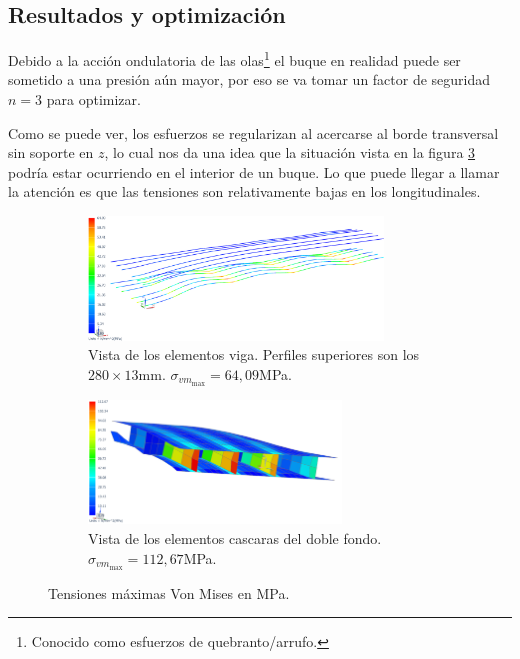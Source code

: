 \documentclass[onecolumn,10pt,titlepage]{article}
\begin{document}
\subsection{Resultados y optimización}
Debido a la acción ondulatoria de las olas\footnote{Conocido como esfuerzos de quebranto/arrufo.} el buque en realidad puede ser sometido a una presión aún mayor, por eso se va tomar un factor de seguridad $n=3$ para optimizar.

Como se puede ver, los esfuerzos se regularizan al acercarse al borde transversal sin soporte en $z$, lo cual nos da una idea que la situación vista en la figura \ref{fig:2a} podría estar ocurriendo en el interior de un buque. Lo que puede llegar a llamar la atención es que las tensiones son relativamente bajas en los longitudinales.


 \begin{figure}[htb!]
 \centering
 \begin{subfigure}{0.49\textwidth}
 \begin{framed}
 \includegraphics[height=3.3cm,draft]{fig/longitudinales_a.png}
 \caption{Vista de los elementos viga. Perfiles superiores son los $280\times 13\si{\milli \meter}$. $\sigma_{vm_{\max}}= 64,09 $\si{\mega \pascal}.}
 \label{fig:longitudinalesCasoA}
 \end{framed}
 \end{subfigure}
 \begin{subfigure}{0.49\textwidth}
 \begin{framed}
 \includegraphics[height=3.3cm,draft]{fig/varengas_a.png}
 \caption{Vista de los elementos cascaras del doble fondo. $\sigma_{vm_{\max}}= 112,67 $\si{\mega \pascal}.}
 \label{fig:VarengasCasoA}
 \end{framed}
 \end{subfigure}
 \caption{Tensiones máximas Von Mises en \si{\mega \pascal}.}
 \label{fig:2a}
 \end{figure}
\end{document}
